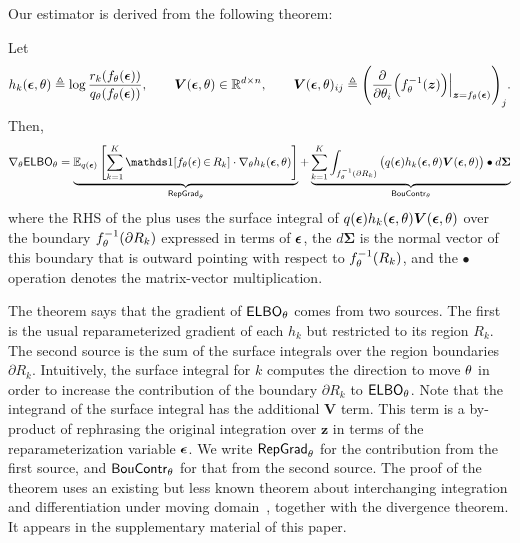 
Our estimator is derived from the following theorem:
\begin{theorem}\label{thm:grad-eq-main}
Let
\[
h_k(\bm{\epsilon},\theta) \triangleq
\log\frac{r_k(f_\theta(\bm{\epsilon}))}{q_\theta(f_\theta(\bm{\epsilon}))},
\qquad
\bm{V}(\bm{\epsilon},\theta) \in \mathbb{R}^{d \times n},
\qquad
\bm{V}(\bm{\epsilon},\theta)_{ij} \triangleq \Bigg(\pdv{\theta_i} \Big(f^{-1}_\theta(\bm{z})\Big)\Bigr|_{\bm{z}=f_{\theta}(\bm{\epsilon})}\Bigg)_j.
\]
Then,
\[
\grad{\tht}{\ELBO{\tht}}
=
\underbrace{\E{q(\bm{\eps})}{\sum_{k=1}^K \indc{f_\tht(\eps) \,{\in}\, R_k} \cdot \grad{\tht}{h_k(\bm{\eps},\tht)}}}_{\ReparamGrad_\tht}
+
\underbrace{\sum_{k=1}^K \int_{f_\tht^{-1}(\partial R_{k})} \big(q(\bm{\eps}) h_k(\bm{\eps},\tht) \bm{V}(\bm{\eps},\tht)\big) \bullet d\bm{\Sigma}}_{\RegionChange_\tht}
\]
where the RHS of the plus uses the surface integral of $q(\bm{\epsilon}) h_k(\bm{\epsilon},\theta) \bm{V}(\bm{\epsilon},\theta)$
over the boundary $f_\theta^{-1}(\partial R_k)$ expressed in terms of $\bm{\epsilon}$,
the $d\bm{\Sigma}$ is the normal vector of this boundary
that is outward pointing with respect to $f_\theta^{-1}(R_k)$,
and the $\bullet$ operation denotes the matrix-vector multiplication.
\end{theorem}
The theorem says that the gradient of ${\mathsf{ELBO}_{\theta}}$ comes from two sources. The first is the usual reparameterized
gradient of each $h_k$ but restricted to its region $R_k$. The second source is the sum of the surface integrals over the region boundaries $\partial R_k$. Intuitively, the surface integral for $k$ computes the direction to move $\theta$ in order to increase the contribution of the boundary $\partial R_k$ to ${\mathsf{ELBO}_{\theta}}$.
Note that the integrand of the surface integral has the additional $\bm{V}$ term.
This term is a by-product of rephrasing the original integration over $\bm{z}$
in terms of the reparameterization variable $\bm{\epsilon}$.
We write $\mathsf{RepGrad}_\theta$ for the contribution from the first source,
and $\mathsf{BouContr}_\theta$ for that from the second source. The proof of the theorem uses
an existing but less known theorem about interchanging integration and differentiation under moving
domain~\cite{FlandersAMM1973}, together with the divergence theorem. It appears in the supplementary material of this paper.

